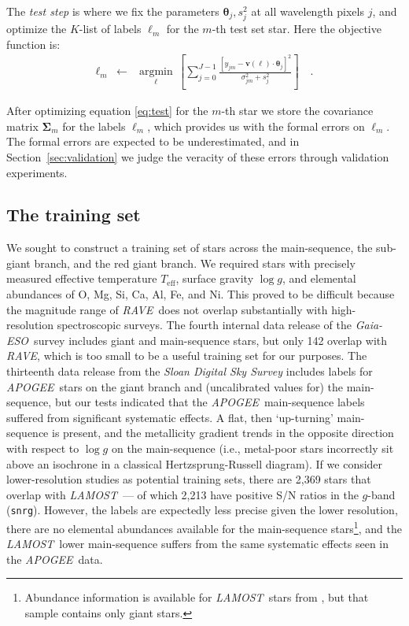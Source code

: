 \documentclass[preprint]{aastex61}
\newcommand{\acronym}[1]{{\small{#1}}}
\newcommand{\project}[1]{\textsl{#1}}
\newcommand{\rave}{\project{\acronym{RAVE}}}
\newcommand{\ges}{\project{Gaia-ESO}}
\newcommand{\apogee}{\project{\acronym{APOGEE}}}
\newcommand{\lamost}{\project{\acronym{LAMOST}}}
\newcommand{\teff}{T_{\mathrm{eff}}}
\newcommand{\logg}{\log g}
\newcommand{\Dvector}[1]{\boldsymbol{#1}}
\newcommand{\vectheta}{\Dvector{\theta}}
\newcommand{\vecv}{\Dvector{v}}
\newcommand{\argmin}[1]{\underset{#1}{\operatorname{argmin}}\,}
\begin{document}
The \emph{test step} is where we fix the parameters $\vectheta_j,s_j^2$ at all wavelength
pixels $j$, and optimize the $K$-list of labels $\ell_m$ for the $m$-th test set star.  Here
the objective function is:
\begin{eqnarray}\label{eq:test}
  \ell_m &\leftarrow& \argmin{\ell}\left[
    \sum_{j=0}^{J-1} \frac{[y_{jm}-\vecv(\ell)\cdot\vectheta_j]^2}{\sigma_{jm}^2 + s_j^2}
    \right]
  \quad .
\end{eqnarray}

After optimizing equation \ref{eq:test} for the $m$-th star we store the covariance matrix 
$\bm{\Sigma}_m$ for the labels $\ell_m$, which provides us with the formal errors on $\ell_m$. 
The formal errors are expected to be underestimated, and in Section~\ref{sec:validation} 
we judge the veracity of these errors through validation experiments.



\subsection{The training set}
\label{sec:the-training-set}


We sought to construct a training set of stars across the main-sequence, the
sub-giant branch, and the red giant branch.  We required stars with precisely measured
effective temperature $\teff$, surface gravity $\logg$, and elemental abundances
of O, Mg, Si, Ca, Al, Fe, and Ni.  This proved to be difficult because the magnitude
range of \rave\ does not overlap substantially with high-resolution spectroscopic
surveys.  The fourth internal data release of the \ges\ survey includes 
giant and main-sequence stars, but only 142 overlap with \rave, which is too small to
be a useful training set for our purposes.  The thirteenth data release from the 
\project{Sloan Digital Sky Survey} \citep{sloan_dr13} includes labels for \apogee\ stars on the
giant branch and (uncalibrated values for) the main-sequence, but our tests indicated
that the \apogee\ main-sequence labels suffered from significant systematic effects.  
A flat, then `up-turning' main-sequence is present, and the metallicity gradient trends in 
the opposite direction with respect to $\logg$ on the main-sequence (i.e., metal-poor
stars incorrectly sit above an isochrone in a classical Hertzsprung-Russell diagram).
If we consider lower-resolution studies as potential training sets, there are 2,369
stars that overlap with \lamost\ --- of which 2,213 have positive S/N ratios in the 
$g$-band (\texttt{snrg}).  However, the labels are expectedly less precise given the
lower resolution, there are no elemental abundances available for the main-sequence 
stars\footnote{Abundance information is available for \lamost\ stars from \citet{Ho_2016},
but that sample contains only giant stars.}, and the \lamost\ lower main-sequence suffers
from the same systematic effects seen in the \apogee\ data. 
\end{document}
